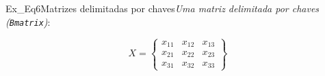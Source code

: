 \begin{texercise}{Ex_Eq6}{Matrizes delimitadas por chaves}\textit{Uma matriz delimitada por chaves ({\tt Bmatrix})}:\par\smallskip%
\begin{tcboutputlisting}
    \begin{center}
        \begin{equation*}
            X =
            \begin{Bmatrix} 
                x_{11} & x_{12} & x_{13} \\ 
                x_{21} & x_{22} & x_{23} \\ 
                x_{31} & x_{32} & x_{33} 
            \end{Bmatrix}
        \end{equation*}
    \end{center}
\end{tcboutputlisting}
\tcbuselistingtext%
\end{texercise}



